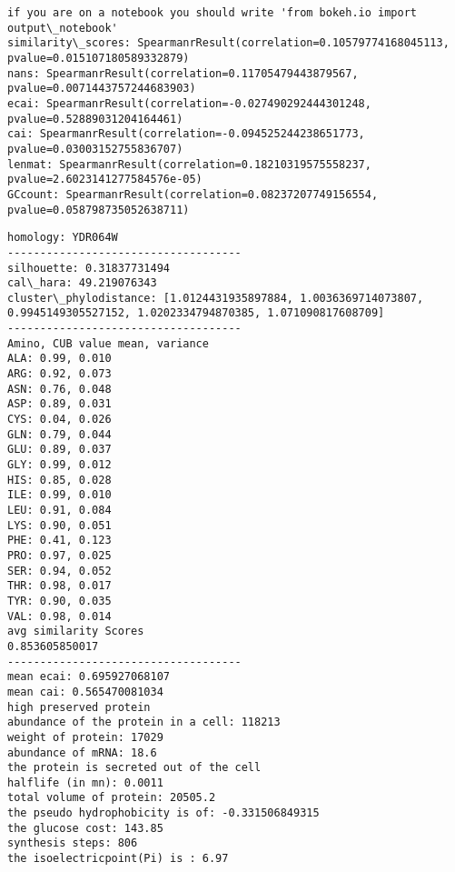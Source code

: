 \documentclass[11pt]{article}
\begin{document}
    \begin{Verbatim}[commandchars=\\\{\}]
 if you are on a notebook you should write 'from bokeh.io import output\_notebook'
similarity\_scores: SpearmanrResult(correlation=0.10579774168045113, pvalue=0.015107180589332879)
nans: SpearmanrResult(correlation=0.11705479443879567, pvalue=0.0071443757244683903)
ecai: SpearmanrResult(correlation=-0.027490292444301248, pvalue=0.52889031204164461)
cai: SpearmanrResult(correlation=-0.094525244238651773, pvalue=0.03003152755836707)
lenmat: SpearmanrResult(correlation=0.18210319575558237, pvalue=2.6023141277584576e-05)
GCcount: SpearmanrResult(correlation=0.08237207749156554, pvalue=0.058798735052638711)

    \end{Verbatim}

    
    
    
    
    
    
    
    
    \begin{Verbatim}[commandchars=\\\{\}]
homology: YDR064W
------------------------------------
silhouette: 0.31837731494
cal\_hara: 49.219076343
cluster\_phylodistance: [1.0124431935897884, 1.0036369714073807, 0.9945149305527152, 1.0202334794870385, 1.071090817608709]
------------------------------------
Amino, CUB value mean, variance
ALA: 0.99, 0.010
ARG: 0.92, 0.073
ASN: 0.76, 0.048
ASP: 0.89, 0.031
CYS: 0.04, 0.026
GLN: 0.79, 0.044
GLU: 0.89, 0.037
GLY: 0.99, 0.012
HIS: 0.85, 0.028
ILE: 0.99, 0.010
LEU: 0.91, 0.084
LYS: 0.90, 0.051
PHE: 0.41, 0.123
PRO: 0.97, 0.025
SER: 0.94, 0.052
THR: 0.98, 0.017
TYR: 0.90, 0.035
VAL: 0.98, 0.014
avg similarity Scores
0.853605850017
------------------------------------
mean ecai: 0.695927068107
mean cai: 0.565470081034
high preserved protein
abundance of the protein in a cell: 118213
weight of protein: 17029
abundance of mRNA: 18.6
the protein is secreted out of the cell
halflife (in mn): 0.0011
total volume of protein: 20505.2
the pseudo hydrophobicity is of: -0.331506849315
the glucose cost: 143.85
synthesis steps: 806
the isoelectricpoint(Pi) is : 6.97

    \end{Verbatim}
\end{document}
